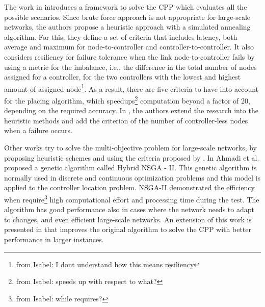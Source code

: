 \documentclass{IEEEtran}
\newcommand\fia[1]{{\color{red}\footnote{\color{red}from Isabel: #1}}} %
\begin{document}
 
The work in \cite{LaGe15} introduces a framework to solve the CPP which evaluates all the possible scenarios. Since brute force approach is not appropriate for large-scale networks, the authors propose a heuristic approach with a simulated annealing algorithm. For this, they define a set of criteria that includes latency, both average and maximum for node-to-controller and controller-to-controller. It also considers resiliency for failure tolerance when the link node-to-controller fails by using a metric for the imbalance, i.e., the difference in the total number of nodes assigned for a controller, for the two controllers with the lowest and highest amount of assigned node\fia{I dont understand how this means resiliency}. As a result, there are five criteria to have into account for the placing algorithm, which speedups\fia{speeds up with respect to what?} computation beyond a factor of 20, depending on the required accuracy. In \cite{LaGe15}, the authors extend the research into the heuristic methods and add the criterion of the number of controller-less nodes when a failure occurs.

Other works try to solve the multi-objective problem for large-scale networks, by proposing heuristic schemes and using the criteria proposed by \cite{LaGeb15}. In \cite{AhJa15} Ahmadi et al. proposed a genetic algorithm called Hybrid NSGA - II. This genetic algorithm is normally used in discrete and continuous optimization problems and this model is applied to the controller location problem. NSGA-II demonstrated the efficiency when require\fia{while requires?} high computational effort and processing time during the test. The algorithm has good performance also in cases where the network needs to adapt to changes, and even efficient large-scale networks.
An extension of this work is presented in \cite{JaAh15} that improves the original algorithm to solve the CPP with better performance in larger instances. 
\end{document}
